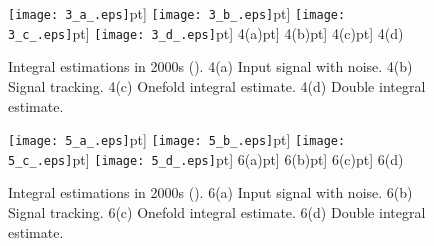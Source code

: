 \documentclass[10pt,journal]{IEEEtran}
\begin{document}
\begin{figure}[H]
\begin{center}
\texttt{[image: 3\_a\_.eps]}\0pt]
\texttt{[image: 3\_b\_.eps]}\0pt]
\texttt{[image: 3\_c\_.eps]}\0pt]
\texttt{[image: 3\_d\_.eps]}\0pt]
{\small 4(a)}\0pt]
{\small 4(b)}\0pt]
{\small 4(c)}\0pt]
{\small 4(d)}
\end{center}
\caption{Integral estimations in 2000s (). 4(a)
Input signal with noise. 4(b) Signal tracking. 4(c) Onefold integral
estimate. 4(d) Double integral estimate.}
\end{figure}

\begin{figure}[H]
\begin{center}
\texttt{[image: 5\_a\_.eps]}\0pt]
\texttt{[image: 5\_b\_.eps]}\0pt]
\texttt{[image: 5\_c\_.eps]}\0pt]
\texttt{[image: 5\_d\_.eps]}\0pt]
{\small 6(a)}\0pt]
{\small 6(b)}\0pt]
{\small 6(c)}\0pt]
{\small 6(d)}
\end{center}
\caption{Integral estimations in 2000s (). 6(a) Input
signal with noise. 6(b) Signal tracking. 6(c) Onefold integral estimate. 6(d)
Double integral estimate.}
\end{figure}
\end{document}

